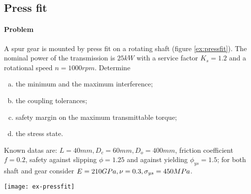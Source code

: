 \newpage
\subsection{Press fit}
	\paragraph{Problem} A spur gear is mounted by press fit on a rotating shaft (figure \ref{ex:pressfit}). The nominal power of the transmission is $25kW$ with a service factor $K_s = 1.2$ and a rotational speed $n = 1000rpm$. Determine
	\begin{enumerate}[a)]
		\item the minimum and the maximum interference;
		\item the coupling tolerances;
		\item safety margin on the maximum transmittable torque;
		\item the stress state.
	\end{enumerate}
	Known datas are: $L = 40mm, D_c = 60mm, D_o = 400mm$, friction coefficient $f = 0.2$, safety against slipping $\phi = 1.25$ and against yielding $\phi_{ys} = 1.5$; for both shaft and gear consider $E = 210 GPa, \nu = 0.3, \sigma_{ys} = 450MPa$.
	
	\begin{SCfigure}[1.5][bh]
		\centering \texttt{[image: ex-pressfit]} 
		\caption{sketch of a spur gear mounted by press fit on a rotating shaft.}
		\label{ex:pressfit}
	\end{SCfigure}

